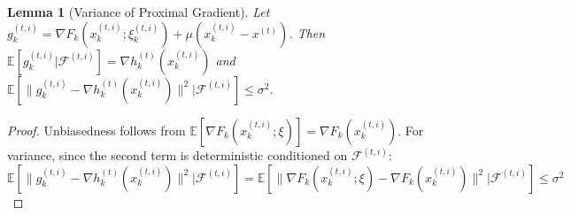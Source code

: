 \documentclass{article}
\newtheorem{lemma}{Lemma}
\begin{document}
\begin{lemma}[Variance of Proximal Gradient]
Let $g_k^{(t,i)} = \nabla F_k(x_k^{(t,i)}; \xi_k^{(t,i)}) + \mu(x_k^{(t,i)} - x^{(t)})$. Then $\mathbb{E}[g_k^{(t,i)} | \mathcal{F}^{(t,i)}] = \nabla h_k^{(t)}(x_k^{(t,i)})$ and $\mathbb{E}[\|g_k^{(t,i)} - \nabla h_k^{(t)}(x_k^{(t,i)})\|^2 | \mathcal{F}^{(t,i)}] \leq \sigma^2$.
\end{lemma}
\begin{proof}
Unbiasedness follows from $\mathbb{E}[\nabla F_k(x_k^{(t,i)}; \xi)] = \nabla F_k(x_k^{(t,i)})$. For variance, since the second term is deterministic conditioned on $\mathcal{F}^{(t,i)}$:
$$ \mathbb{E}[\|g_k^{(t,i)} - \nabla h_k^{(t)}(x_k^{(t,i)})\|^2 | \mathcal{F}^{(t,i)}] = \mathbb{E}[\|\nabla F_k(x_k^{(t,i)}; \xi) - \nabla F_k(x_k^{(t,i)})\|^2 | \mathcal{F}^{(t,i)}] \leq \sigma^2 $$
\end{proof}
\end{document}
